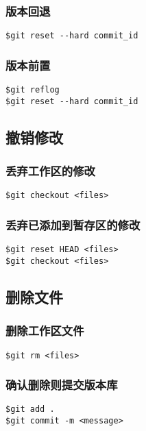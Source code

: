 \subsubsection{版本回退}
\begin{lstlisting}
$git reset --hard commit_id
\end{lstlisting}

\subsubsection{版本前置}
\begin{lstlisting}
$git reflog
$git reset --hard commit_id
\end{lstlisting}

\subsection{撤销修改}
\subsubsection{丢弃工作区的修改}
\begin{lstlisting}
$git checkout <files>
\end{lstlisting}

\subsubsection{丢弃已添加到暂存区的修改}
\begin{lstlisting}
$git reset HEAD <files>
$git checkout <files>
\end{lstlisting}

\subsection{删除文件}
\subsubsection{删除工作区文件}
\begin{lstlisting}
$git rm <files>
\end{lstlisting}

\subsubsection{确认删除则提交版本库}
\begin{lstlisting}
$git add .
$git commit -m <message>
\end{lstlisting}

